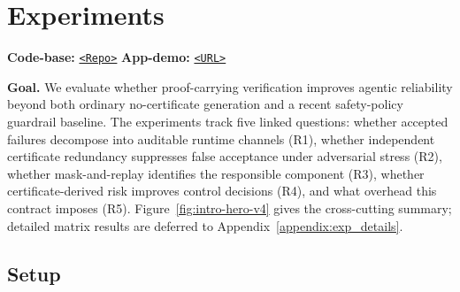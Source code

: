 
\section{Experiments}
\label{sec:experiments}

\noindent\textbf{Code-base:} \href{https://anonymous.4open.science/r/p-c-m-a-E866/README.md}{\texttt{<Repo>}}
\hfill
\textbf{App-demo:} \href{https://huggingface.co/spaces/anonymous-artifact/pcg-demo}{\texttt{<URL>}}

\smallskip
\noindent\textbf{Goal.}
We evaluate whether proof-carrying verification improves agentic reliability beyond both
ordinary no-certificate generation and a recent safety-policy guardrail baseline. The experiments
track five linked questions: whether accepted failures decompose into auditable runtime channels
(R1), whether independent certificate redundancy suppresses false acceptance under adversarial
stress (R2), whether mask-and-replay identifies the responsible component (R3), whether
certificate-derived risk improves control decisions (R4), and what overhead this contract imposes
(R5). Figure~\ref{fig:intro-hero-v4} gives the cross-cutting summary; detailed matrix results are
deferred to Appendix~\ref{appendix:exp_details}.


\subsection{Setup}
\label{sec:exp_setup}

